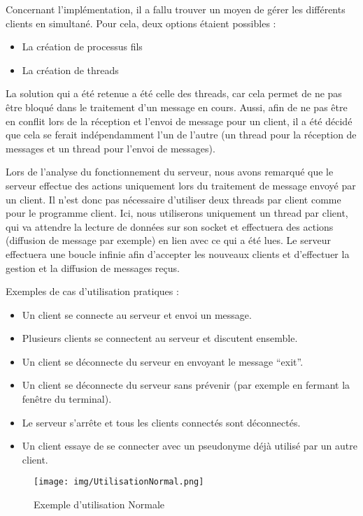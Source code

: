 \documentclass[
]{article}
\providecommand{\tightlist}{%
  \setlength{\itemsep}{0pt}\setlength{\parskip}{0pt}}
\begin{document}
Concernant l'implémentation, il a fallu trouver un moyen de gérer les
différents clients en simultané. Pour cela, deux options étaient
possibles :

\begin{itemize}
\tightlist
\item
  La création de processus fils\\
\item
  La création de threads
\end{itemize}

La solution qui a été retenue a été celle des threads, car cela permet
de ne pas être bloqué dans le traitement d'un message en cours. Aussi,
afin de ne pas être en conflit lors de la réception et l'envoi de
message pour un client, il a été décidé que cela se ferait
indépendamment l'un de l'autre (un thread pour la réception de messages
et un thread pour l'envoi de messages).

Lors de l'analyse du fonctionnement du serveur, nous avons remarqué que
le serveur effectue des actions uniquement lors du traitement de message
envoyé par un client. Il n'est donc pas nécessaire d'utiliser deux
threads par client comme pour le programme client. Ici, nous utiliserons
uniquement un thread par client, qui va attendre la lecture de données
sur son socket et effectuera des actions (diffusion de message par
exemple) en lien avec ce qui a été lues. Le serveur effectuera une
boucle infinie afin d'accepter les nouveaux clients et d'effectuer la
gestion et la diffusion de messages reçus.

Exemples de cas d'utilisation pratiques :

\begin{itemize}
\tightlist
\item
  Un client se connecte au serveur et envoi un message.
\item
  Plusieurs clients se connectent au serveur et discutent ensemble.
\item
  Un client se déconnecte du serveur en envoyant le message ``exit''.
\item
  Un client se déconnecte du serveur sans prévenir (par exemple en
  fermant la fenêtre du terminal).
\item
  Le serveur s'arrête et tous les clients connectés sont déconnectés.
\item
  Un client essaye de se connecter avec un pseudonyme déjà utilisé par
  un autre client.
\end{itemize}

\begin{figure}[H]
\centering
\texttt{[image: img/UtilisationNormal.png]}
\caption{Exemple d'utilisation Normale}
\end{figure}
\end{document}

